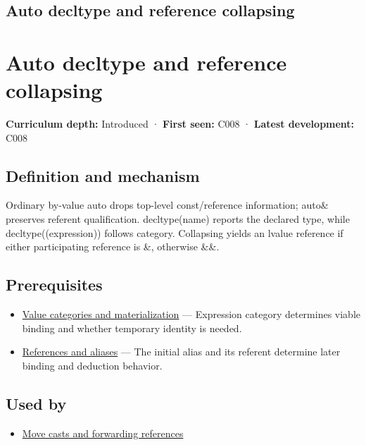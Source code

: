 \hypertarget{appendix-5d4252a42886}{}
\section*{Auto decltype and reference collapsing}
\chapter{Auto decltype and reference collapsing}\label{appendix-5d4252a42886-auto-decltype-and-reference-collapsing}

\textbf{Curriculum depth:} Introduced · \textbf{First seen:} C008 · \textbf{Latest development:} C008

\section{Definition and mechanism}\label{appendix-5d4252a42886-definition-and-mechanism}

Ordinary by-value auto drops top-level const/reference information; auto\& preserves referent qualification. decltype(name) reports the declared type, while decltype((expression)) follows category. Collapsing yields an lvalue reference if either participating reference is \&, otherwise \&\&.

\section{Prerequisites}\label{appendix-5d4252a42886-prerequisites}

\begin{itemize}
\tightlist
\item
  \hyperref[appendix-1121b30eaeb0]{Value categories and materialization} --- Expression category determines viable binding and whether temporary identity is needed.
\item
  \hyperref[appendix-d6d562ca9fbb]{References and aliases} --- The initial alias and its referent determine later binding and deduction behavior.
\end{itemize}

\section{Used by}\label{appendix-5d4252a42886-used-by}

\begin{itemize}
\tightlist
\item
  \hyperref[appendix-0104b704fb11]{Move casts and forwarding references}
\end{itemize}

